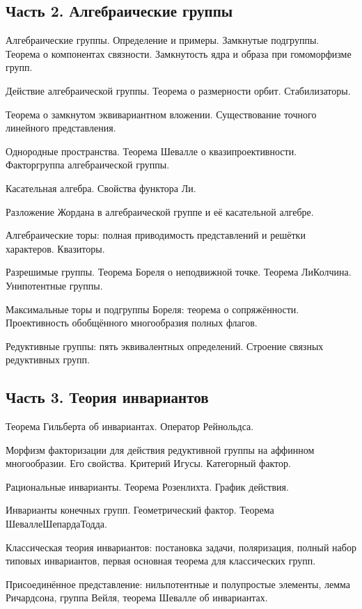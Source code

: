 \documentclass[a4paper]{article}
\begin{document}
\subsection*{Часть 2. Алгебраические группы}

\begin{nums}{0}
\item Алгебраические группы. Определение и примеры. Замкнутые подгруппы. Теорема о компонентах связности.
Замкнутость ядра и образа при гомоморфизме групп.
\item Действие алгебраической группы. Теорема о размерности орбит. Стабилизаторы.
\item Теорема о замкнутом эквивариантном вложении. Существование точного линейного представления.
\item Однородные пространства. Теорема Шевалле о квазипроективности. Факторгруппа алгебраической группы.
\item Касательная алгебра. Свойства функтора Ли.
\item Разложение Жордана в алгебраической группе и её касательной алгебре.
\item Алгебраические торы: полная приводимость представлений и решётки характеров. Квазиторы.
\item Разрешимые группы.  Теорема Бореля о неподвижной точке. Теорема Ли\ч Колчина. Унипотентные группы.
\item Максимальные торы и подгруппы Бореля: теорема о сопряжённости. Проективность обобщённого многообразия полных флагов.
\item Редуктивные группы: пять эквивалентных определений. Строение связных редуктивных групп.
\end{nums}

\subsection*{Часть 3. Теория инвариантов}

\begin{nums}{0}
\item Теорема Гильберта об инвариантах. Оператор Рейнольдса.
\item Морфизм факторизации для действия редуктивной группы на аффинном многообразии. Его свойства. Критерий Игусы.
Категорный фактор.
\item  Рациональные инварианты. Теорема Розенлихта. График действия.
\item Инварианты конечных групп. Геометрический фактор. Теорема Шевалле\ч Шепарда\ч Тодда.
\item Классическая теория инвариантов: постановка задачи, поляризация, полный набор типовых инвариантов,
первая основная теорема для классических групп.
\item Присоединённое представление: нильпотентные и полупростые элементы, лемма Ричардсона, группа Вейля, теорема Шевалле об инвариантах.
\end{nums}

\medskip\dmvntrail
\end{document}
